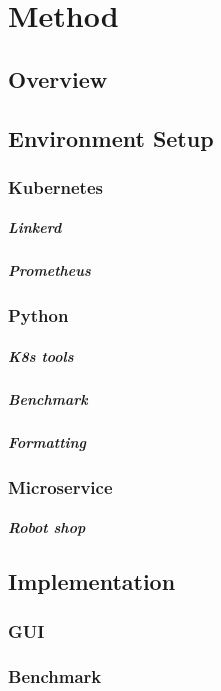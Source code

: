 \documentclass[
	english,
	ruledheaders=section,%
	class=report,%
	thesis={type=master},%
	accentcolor=8c,%
	custommargins=true,%
	marginpar=false,%
	parskip=half-,%
	fontsize=11pt,%
]{tudapub}
\begin{document}
\chapter{Method}
\section{Overview}
\section{Environment Setup}
\subsection{Kubernetes}
\paragraph{Linkerd}
\paragraph{Prometheus}
\subsection{Python}
\paragraph{K8s tools}
\paragraph{Benchmark}
\paragraph{Formatting}
\subsection{Microservice}
\paragraph{Robot shop}
\section{Implementation}
\subsection{GUI}
\subsection{Benchmark}
\end{document}
